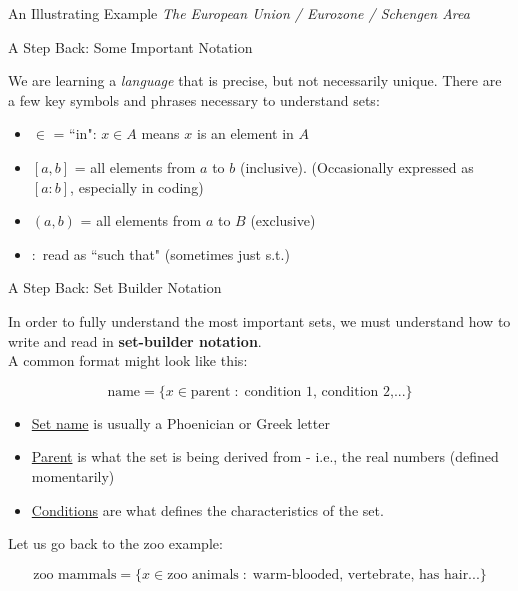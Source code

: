 \documentclass[10pt]{beamer}
\begin{document}
\begin{frame}{An Illustrating Example}
    \textit{The European Union / Eurozone / Schengen Area}
\end{frame}

\begin{frame}{A Step Back: Some Important Notation}

    We are learning a \textit{language} that is precise, but not necessarily unique. There are a few key symbols and phrases necessary to understand sets:

    \begin{itemize}
        \item $\in$ = ``in": $x \in A$ means $x$ is an element in $A$
        \pause
        \item $[a,b]$ = all elements from $a$ to $b$ (inclusive). (Occasionally expressed as $[a:b]$, especially in coding)
        \pause
        \item $(a,b)$ = all elements from $a$ to $B$ (exclusive)
        \pause
        \item $:$  read as ``such that" (sometimes just s.t.)
    \end{itemize}
\end{frame}

\begin{frame}{A Step Back: Set Builder Notation}

In order to fully understand the most important sets, we must understand how to write and read in \textbf{set-builder notation}. \\

A common format might look like this:

\[\text{name} = \{x \in \text{parent} \;: \; \text{condition 1, condition 2,...}\} \]

\begin{itemize}
    \item \underline{Set name} is usually a Phoenician or Greek letter
    \pause
    \item \underline{Parent} is what the set is being derived from - i.e., the real numbers (defined momentarily)
    \pause
    \item \underline{Conditions} are what defines the characteristics of the set.
    \pause
\end{itemize}

Let us go back to the zoo example:

\[\text{zoo mammals} = \{x \in \text{zoo animals} \; : \; \text{warm-blooded, vertebrate, has hair...} \}\]
\end{frame}
\end{document}
